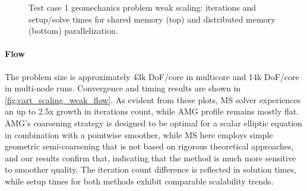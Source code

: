 \begin{figure} [htbp]
  \begin{subfigure}[t]{0.48\textwidth}
    \centering
    
  \end{subfigure}
  \hfill
  \begin{subfigure}[t]{0.48\textwidth}
    \centering
    
  \end{subfigure}
  \begin{subfigure}[t]{0.48\textwidth}
    \centering
    
  \end{subfigure}
  \hfill
  \begin{subfigure}[t]{0.48\textwidth}
    \centering
    
  \end{subfigure}
  \caption[Test case 1 geomechanics problem weak scaling]{Test case 1 geomechanics problem weak scaling: iterations and setup/solve times for shared memory (top) and distributed memory (bottom) parallelization.}
  \label{fig:cart_scaling_weak_mech}
\end{figure}

\paragraph{Flow}
The problem size is approximately 43k DoF/core in multicore and 14k DoF/core in multi-node runs.   Convergence and timing results are shown in \cref{fig:cart_scaling_weak_flow}.   As evident from these plots, MS solver experiences an up to 2.5x growth in iterations count, while AMG profile remains mostly flat.   AMG's coarsening strategy is designed to be optimal for a scalar elliptic equation in combination with a pointwise smoother, while MS here employs simple geometric semi-coarsening that is not based on rigorous theoretical approaches, and our results confirm that, indicating that the method is much more sensitive to smoother quality.   The iteration count difference is reflected in solution times, while setup times for both methods exhibit comparable scalability trends.

